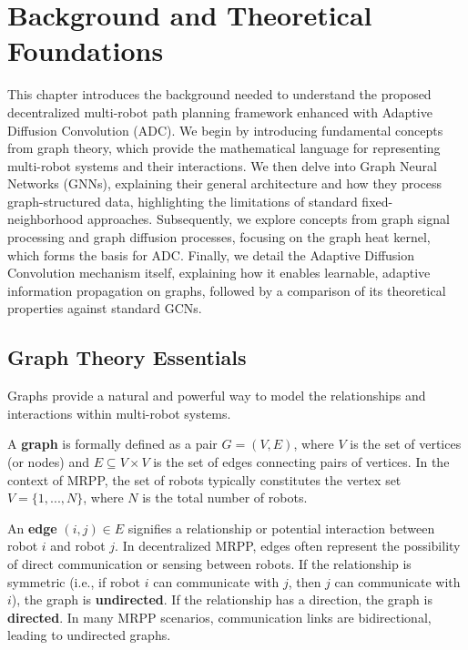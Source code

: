 \chapter{Background and Theoretical Foundations}
\label{chap:background}

This chapter introduces the background needed to understand the proposed decentralized multi-robot path planning framework enhanced with Adaptive Diffusion Convolution (ADC). We begin by introducing fundamental concepts from graph theory, which provide the mathematical language for representing multi-robot systems and their interactions. We then delve into Graph Neural Networks (GNNs), explaining their general architecture and how they process graph-structured data, highlighting the limitations of standard fixed-neighborhood approaches. Subsequently, we explore concepts from graph signal processing and graph diffusion processes, focusing on the graph heat kernel, which forms the basis for ADC. Finally, we detail the Adaptive Diffusion Convolution mechanism itself, explaining how it enables learnable, adaptive information propagation on graphs, followed by a comparison of its theoretical properties against standard GCNs.

\section{Graph Theory Essentials}
\label{sec:graph_theory}

Graphs provide a natural and powerful way to model the relationships and interactions within multi-robot systems.

A \textbf{graph} is formally defined as a pair $G = (V, E)$, where $V$ is the set of vertices (or nodes) and $E \subseteq V \times V$ is the set of edges connecting pairs of vertices. In the context of MRPP, the set of robots typically constitutes the vertex set $V = \{1, ..., N\}$, where $N$ is the total number of robots.

An \textbf{edge} $(i, j) \in E$ signifies a relationship or potential interaction between robot $i$ and robot $j$. In decentralized MRPP, edges often represent the possibility of direct communication or sensing between robots. If the relationship is symmetric (i.e., if robot $i$ can communicate with $j$, then $j$ can communicate with $i$), the graph is \textbf{undirected}. If the relationship has a direction, the graph is \textbf{directed}. In many MRPP scenarios, communication links are bidirectional, leading to undirected graphs.

